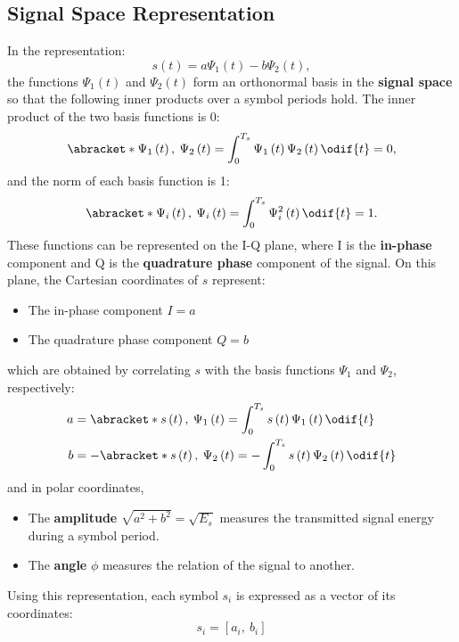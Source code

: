 \documentclass{article}
\begin{document}
\subsection{Signal Space Representation}
In the representation:
\begin{equation*}
    s\left( t \right) = a \Psi_1\left( t \right) - b \Psi_2\left( t \right),
\end{equation*}
the functions \(\Psi_1\left( t \right)\) and \(\Psi_2\left( t \right)\)
form an orthonormal basis in the \textbf{signal space} so that the
following inner products over a symbol periods hold. The inner product
of the two basis functions is 0:
\begin{equation*}
    \abracket*{\Psi_1\left( t \right),\: \Psi_2\left( t \right)} = \int_{0}^{T_s} \Psi_1\left( t \right) \Psi_2\left( t \right) \odif{t} = 0,
\end{equation*}
and the norm of each basis function is 1:
\begin{equation*}
    \abracket*{\Psi_i\left( t \right),\: \Psi_i\left( t \right)} = \int_{0}^{T_s} \Psi_i^2\left( t \right) \odif{t} = 1.
\end{equation*}
These functions can be represented on the I-Q plane, where I is the
\textbf{in-phase} component and Q is the \textbf{quadrature phase}
component of the signal.
On this plane, the Cartesian coordinates of \(s\) represent:
\begin{itemize}
    \item The in-phase component \(I = a\)
    \item The quadrature phase component \(Q = b\)
\end{itemize}
which are obtained by correlating \(s\) with the basis functions
\(\Psi_1\) and \(\Psi_2\), respectively:
\begin{align*}
    a & = \abracket*{s\left( t \right),\: \Psi_1\left( t \right)} = \int_{0}^{T_s} s\left( t \right) \Psi_1\left( t \right) \odif{t}   \\
    b & = -\abracket*{s\left( t \right),\: \Psi_2\left( t \right)} = -\int_{0}^{T_s} s\left( t \right) \Psi_2\left( t \right) \odif{t}
\end{align*}
and in polar coordinates,
\begin{itemize}
    \item The \textbf{amplitude} \(\sqrt{a^2 + b^2} = \sqrt{E_s}\)
          measures the transmitted signal energy during a symbol
          period.
    \item The \textbf{angle} \(\phi\) measures the relation of the
          signal to another.
\end{itemize}
Using this representation, each symbol \(s_i\) is expressed as a vector
of its coordinates:
\begin{equation*}
    s_i = \left[ a_i,\: b_i \right]
\end{equation*}
\end{document}
